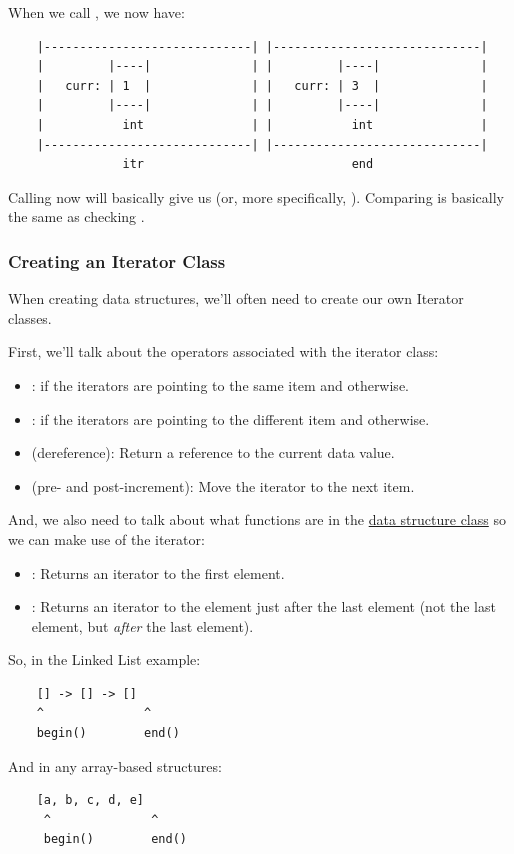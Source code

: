 \documentclass[letterpaper]{article}
\begin{document}
\bigskip 

When we call , we now have: 
\begin{verbatim}
    |-----------------------------| |-----------------------------|
    |         |----|              | |         |----|              |
    |   curr: | 1  |              | |   curr: | 3  |              |
    |         |----|              | |         |----|              |
    |           int               | |           int               |
    |-----------------------------| |-----------------------------|
                itr                             end
\end{verbatim}
Calling  now will basically give us  (or, more specifically, ). Comparing  is basically the same as checking . 

\subsubsection{Creating an Iterator Class}
When creating data structures, we'll often need to create our own Iterator classes. 

\bigskip 

First, we'll talk about the operators associated with the iterator class: 
\begin{itemize}
    \item \code{==}:  if the iterators are pointing to the same item and  otherwise. 
    \item \code{!=}:  if the iterators are pointing to the different item and  otherwise. 
    \item \code{*} (dereference): Return a reference to the current data value. 
    \item \code{++} (pre- and post-increment): Move the iterator to the next item. 
\end{itemize}

And, we also need to talk about what functions are in the \underline{data structure class} so we can make use of the iterator:
\begin{itemize}
    \item {}: Returns an iterator to the first element. 
    \item {}: Returns an iterator to the element just after the last element (not the last element, but \emph{after} the last element).  
\end{itemize}
So, in the Linked List example: 
\begin{verbatim}
    [] -> [] -> []
    ^              ^
    begin()        end()
\end{verbatim}
And in any array-based structures: 
\begin{verbatim}
    [a, b, c, d, e]
     ^              ^
     begin()        end()
\end{verbatim}
\end{document}
